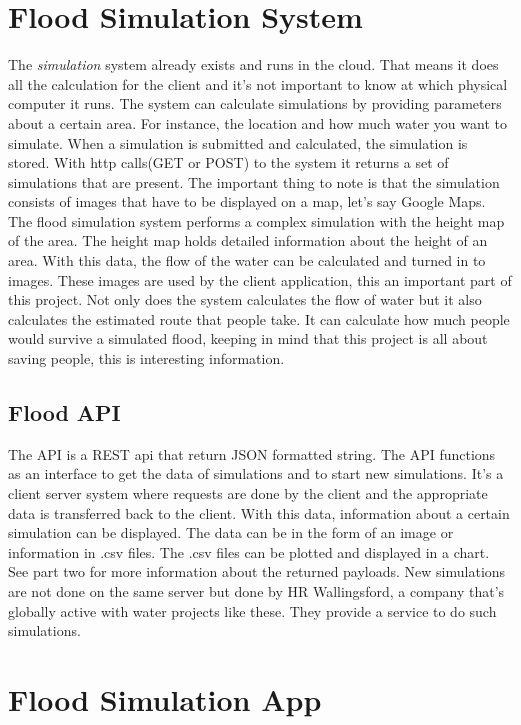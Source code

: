 \section{Flood Simulation System}
The \emph{simulation} system already exists and runs in the cloud. That means it does all the calculation for the client and it's not important to know at which physical computer it runs. The system can calculate simulations by providing parameters about a certain area. For instance, the location and how much water you want to simulate. When a simulation is submitted and calculated, the simulation is stored. With http calls(GET or POST) to the system it returns a set of simulations that are present. The important thing to note is that the simulation consists of images that have to be displayed on a map, let's say Google Maps. The flood simulation system performs a complex simulation with the height map of the area. The height map holds detailed information about the height of an area. With this data, the flow of the water can be calculated and turned in to images. These images are used by the client application, this an important part of this project.
Not only does the system calculates the flow of water but it also calculates the estimated route that people take. It can calculate how much people would survive a simulated flood, keeping in mind that this project is all about saving people, this is interesting information.
 
\subsection{Flood API}
The API is a REST api that return JSON formatted string. The API functions as an interface to get the data of simulations and to start new simulations. It's a client server system where requests are done by the client and the appropriate data is transferred back to the client. With this data, information about a certain simulation can be displayed. The data can be in the form of an image or information in .csv files. The .csv files can be plotted and displayed in a chart. See part two for more information about the returned payloads.
New simulations are not done on the same server but done by HR Wallingsford, a company that's globally active with water projects like these. They provide a service to do such simulations.


\section{Flood Simulation App}
